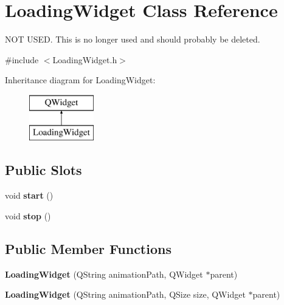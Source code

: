\hypertarget{class_loading_widget}{\section{Loading\-Widget Class Reference}
\label{class_loading_widget}
}


N\-O\-T U\-S\-E\-D. This is no longer used and should probably be deleted.  




{\ttfamily \#include $<$Loading\-Widget.\-h$>$}

Inheritance diagram for Loading\-Widget\-:\begin{figure}[H]
\begin{center}
\leavevmode
\includegraphics[height=2.000000cm]{class_loading_widget}
\end{center}
\end{figure}
\subsection*{Public Slots}
\begin{DoxyCompactItemize}
\item 
\hypertarget{class_loading_widget_a6866e0b25e395ab973f41d48b57020d2}{void {\bfseries start} ()}\label{class_loading_widget_a6866e0b25e395ab973f41d48b57020d2}

\item 
\hypertarget{class_loading_widget_a6cfd3b1fc75ddb48b618da18edd18f9c}{void {\bfseries stop} ()}\label{class_loading_widget_a6cfd3b1fc75ddb48b618da18edd18f9c}

\end{DoxyCompactItemize}
\subsection*{Public Member Functions}
\begin{DoxyCompactItemize}
\item 
\hypertarget{class_loading_widget_a126c32a8450213629f5ac51d979f2d06}{{\bfseries Loading\-Widget} (Q\-String animation\-Path, Q\-Widget $\ast$parent)}\label{class_loading_widget_a126c32a8450213629f5ac51d979f2d06}

\item 
\hypertarget{class_loading_widget_a11ff9f5d5768ee95cd2aa97106f5acb7}{{\bfseries Loading\-Widget} (Q\-String animation\-Path, Q\-Size size, Q\-Widget $\ast$parent)}\label{class_loading_widget_a11ff9f5d5768ee95cd2aa97106f5acb7}

\end{DoxyCompactItemize}


